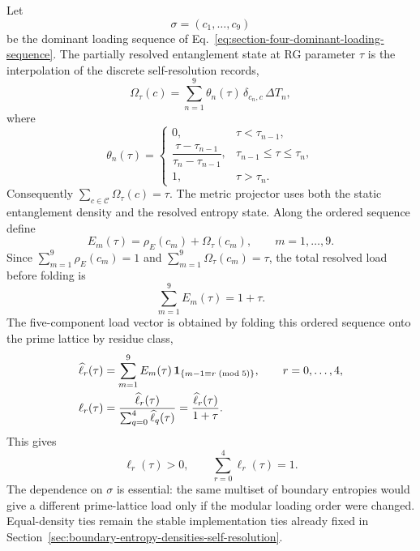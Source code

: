 \documentclass[11pt]{article}
\begin{document}
Let
\begin{equation}
\label{eq:section-five-dominant-sequence-reminder}
 \sigma=(c_1,\ldots,c_9)
\end{equation}
be the dominant loading sequence of
Eq.~\eqref{eq:section-four-dominant-loading-sequence}.  The partially resolved
entanglement state at RG parameter $\tau$ is the interpolation of the discrete
self-resolution records,
\begin{equation}
\label{eq:section-five-interpolated-entropy-state}
 \Omega_{\tau}(c)
 =
 \sum_{n=1}^{9}
 \theta_n(\tau)\,
 \delta_{c_n,c}\,
 \Delta T_n,
\end{equation}
where
\begin{equation}
\label{eq:section-five-resolution-window}
 \theta_n(\tau)
 =
 \begin{cases}
 0,& \tau<\tau_{n-1},\\
 \dfrac{\tau-\tau_{n-1}}{\tau_n-\tau_{n-1}},&
 \tau_{n-1}\le\tau\le\tau_n,\\
 1,& \tau>\tau_n.
 \end{cases}
\end{equation}
Consequently $\sum_{c\in\mathcal C}\Omega_{\tau}(c)=\tau$.  The metric
projector uses both the static entanglement density and the resolved entropy
state.  Along the ordered sequence define
\begin{equation}
\label{eq:section-five-sequence-entanglement-mass}
 E_m(\tau)
 =
 \rho_E(c_m)+\Omega_{\tau}(c_m),
 \qquad
 m=1,\ldots,9.
\end{equation}
Since $\sum_{m=1}^9\rho_E(c_m)=1$ and
$\sum_{m=1}^9\Omega_{\tau}(c_m)=\tau$, the total resolved load before folding
is
\begin{equation}
\label{eq:section-five-total-sequence-load}
 \sum_{m=1}^{9}E_m(\tau)=1+\tau.
\end{equation}
The five-component load vector is obtained by folding this ordered sequence
onto the prime lattice by residue class,
\begin{align}
\label{eq:section-five-load-vector-construction}
 \widehat\ell_r(\tau)
 &=
 \sum_{m=1}^{9}
 E_m(\tau)\,
 \mathbf 1_{\{m-1\equiv r\;({\rm mod}\;5)\}},
 \qquad r=0,\ldots,4,\nonumber\\
 \ell_r(\tau)
 &=
 \frac{\widehat\ell_r(\tau)}
 {\sum_{q=0}^{4}\widehat\ell_q(\tau)}
 =
 \frac{\widehat\ell_r(\tau)}{1+\tau}.
\end{align}
This gives
\begin{equation}
\label{eq:section-five-load-vector-normalization}
 \ell_r(\tau)>0,
 \qquad
 \sum_{r=0}^{4}\ell_r(\tau)=1.
\end{equation}
The dependence on $\sigma$ is essential: the same multiset of boundary
entropies would give a different prime-lattice load only if the modular loading
order were changed.  Equal-density ties remain the stable implementation ties
already fixed in Section~\ref{sec:boundary-entropy-densities-self-resolution}.
\end{document}
